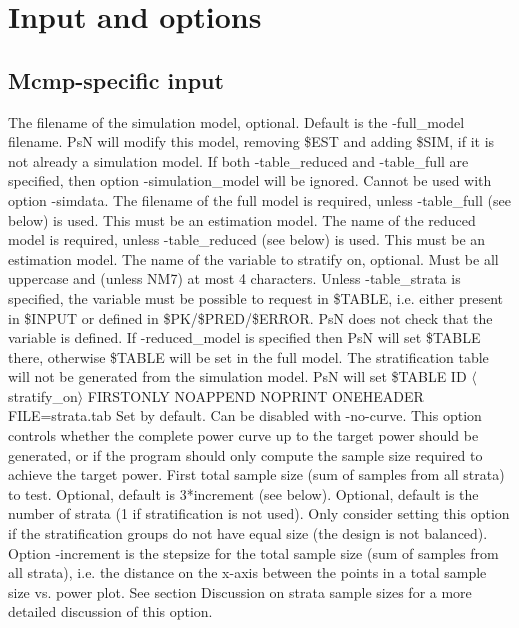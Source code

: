 \section{Input and options}

\subsection{Mcmp-specific input}
\begin{optionlist}
The filename of the simulation model, optional. 
Default is the -full\_model filename. PsN will modify this model, removing \$EST and adding \$SIM, if it is not already a simulation model.
If both -table\_reduced and -table\_full are specified, then option -simulation\_model will be ignored. Cannot be used with option -simdata.
\nextopt
{}
The filename of the full model is required, unless -table\_full (see below) is used. This must be an estimation model.
\nextopt
{}
The name of the reduced model is required, unless -table\_reduced (see below) is used. This must be an estimation model.
\nextopt
{}
The name of the variable to stratify on, optional. Must be all uppercase and (unless NM7) at most 4 characters. 
Unless -table\_strata is specified, the variable must be possible to request in \$TABLE, i.e. either present in \$INPUT or defined in \$PK/\$PRED/\$ERROR. PsN does not check that the variable is defined. If -reduced\_model is specified then PsN will set \$TABLE there, otherwise \$TABLE will be set in the full model. The stratification table will not be generated from the simulation model. PsN will set \$TABLE ID $\langle$stratify\_on$\rangle$ FIRSTONLY NOAPPEND NOPRINT ONEHEADER FILE=strata.tab 
\nextopt
{}
Set by default. Can be disabled with -no-curve. This option controls whether the complete power curve up to the target power should be generated, or if the program should only compute the sample size required to achieve the target power. 
\nextopt
{}
First total sample size (sum of samples from all strata) to test. Optional, default is 3*increment (see below). 
\nextopt
{}
Optional, default is the number of strata (1 if stratification is not used). Only consider setting this option if the stratification groups do not have equal size (the design is not balanced). Option -increment is the stepsize for the total sample size (sum of samples from all strata), i.e. the distance on the x-axis between the points in a total sample size vs. power plot. See section Discussion on strata sample sizes for a more detailed discussion of this option. 

\end{optionlist}
